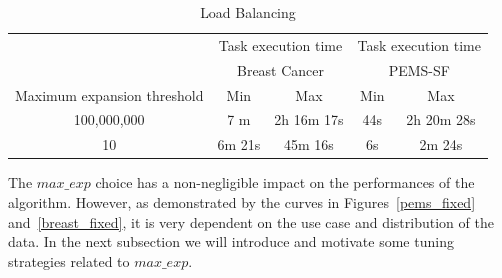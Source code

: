 \begin{table}
\begin{center}
\caption{Load Balancing}
\label{load balance breast}
\begin{tabular}{ |c| c | c| c| c| }
\hline
							    &
\multicolumn{2}{|c|}{Task execution time}    & \multicolumn{2}{|c|}{Task execution time}      \\ 
 & \multicolumn{2}{|c|}{Breast Cancer}    & \multicolumn{2}{|c|}{PEMS-SF}      \\ \hline
	Maximum expansion threshold &   Min          & Max    &   Min          & Max          \\ \hline
	100,000,000                 &    7 m                      & 2h 16m 17s &    44s                      & 2h 20m 28s
  \\ \hline
10                         &    6m 21s                      &        45m 16s  &   6s                      &        2m 24s
 \\ \hline
\end{tabular}
\end{center}
\end{table}





The $max\_exp$ choice has a non-negligible impact on the performances of the algorithm. However, as demonstrated by the curves in Figures~\ref{pems_fixed} and~\ref{breast_fixed}, it is very dependent on the use case and distribution of the data.
In the next subsection we will introduce and motivate some tuning strategies related to $max\_exp$.

